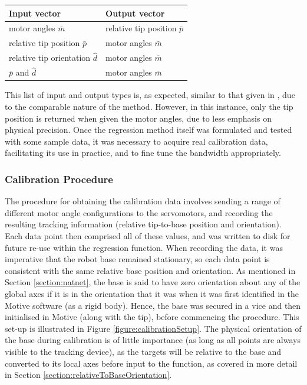 \documentclass[11pt]{article}
\begin{document}
\begin{center}
\label{table:regressionOutputs}
\begin{tabularx}{0.66\textwidth}{ | >{\centering\arraybackslash}p{12em} |>{\centering\arraybackslash}X|} 
\hline
Input vector & Output vector\\
\hline
motor angles $\bar{m}$ & relative tip position $\bar{p}$ \\
relative tip position $\bar{p}$ & motor angles $\bar{m}$ \\
relative tip orientation $\hat{d}$ & motor angles $\bar{m}$ \\
$\bar{p}$ and $\hat{d}$ & motor angles $\bar{m}$\\
\hline
\end{tabularx}
\end{center}

This list of input and output types is, as expected, similar to that given in \cite{GreggSmithDesign}, due to the comparable nature of the method. However, in this instance, only the tip position is returned when given the motor angles, due to less emphasis on physical precision. Once the regression method itself was formulated and tested with some sample data, it was necessary to acquire real calibration data, facilitating its use in practice, and to fine tune the bandwidth appropriately.


\subsubsection{Calibration Procedure}
\label{section:calibrationProcedure}


The procedure for obtaining the calibration data involves sending a range of different motor angle configurations to the servomotors, and recording the resulting tracking information (relative tip-to-base position and orientation). Each data point then comprised all of these values, and was written to disk for future re-use within the regression function. When recording the data, it was imperative that the robot base remained stationary, so each data point is consistent with the same relative base position and orientation. As mentioned in Section \ref{section:natnet}, the base is said to have zero orientation about any of the global axes if it is in the orientation that it was when it was first identified in the Motive software (as a rigid body). Hence, the base was secured in a vice and then initialised in Motive (along with the tip), before commencing the procedure. This set-up is illustrated in Figure \ref{figure:calibrationSetup}. The physical orientation of the base during calibration is of little importance (as long as all points are always visible to the tracking device), as the targets will be relative to the base and converted to its local axes before input to the function, as covered in more detail in Section \ref{section:relativeToBaseOrientation}.
\end{document}
